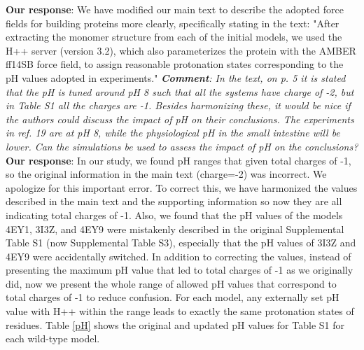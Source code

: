 \documentclass[sn-vancouver]{sn-jnl}
\begin{document}
\newline
\indent
{\bf Our response}: We have modified our main text to describe the adopted force fields for building proteins more clearly, specifically stating in the text:
"After extracting the monomer structure from each of the initial models, we used the H++ server (version 3.2), which also parameterizes the protein with the AMBER ff14SB force field, to assign reasonable protonation states corresponding to the pH values adopted in experiments."
\newline 
\newline
\indent
\textit{\textbf{Comment}:
In the text, on p. 5 it is stated that the pH is tuned around pH 8 such that all the systems have charge of -2, but in Table S1 all the charges are -1.  Besides harmonizing these, it would be nice if the authors could discuss the impact of pH on their conclusions.  The experiments in ref. 19 are at pH 8, while the physiological pH in the small intestine will be lower.  Can the simulations be used to assess the impact of pH on the conclusions?}
\newline
\indent 
{\bf Our response}: In our study, we found pH ranges that given total charges of -1, so the original information in the main text (charge=-2) was incorrect. We apologize for this important error.  To correct this, we have harmonized the values described in the main text and the supporting information so now they are all indicating total charges of -1. Also, we found that the pH values of the models 4EY1, 3I3Z, and 4EY9 were mistakenly described in the original Supplemental Table S1 (now Supplemental Table S3), especially that the pH values of 3I3Z and 4EY9 were accidentally switched. In addition to correcting the values, instead of presenting the maximum pH value that led to total charges of -1 as we originally did, now we present the whole range of allowed pH values that correspond to total charges of -1 to reduce confusion. For each model, any externally set pH value with H++ within the range leads to exactly the same protonation states of residues. Table \ref{pH} shows the original and updated pH values for Table S1 for each wild-type model. 
\end{document}
